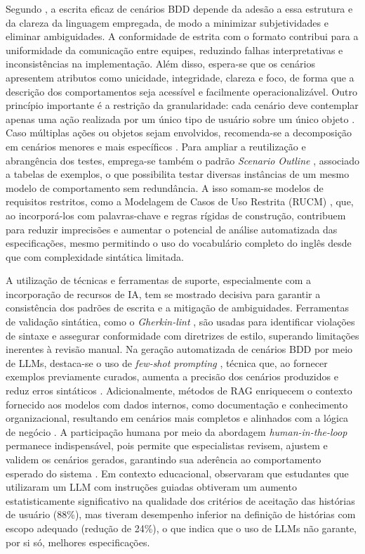 Segundo \cite{Alinezhadtilaki2025}, a escrita eficaz de cenários BDD depende da adesão a essa estrutura e da clareza da linguagem empregada, de modo a minimizar subjetividades e eliminar ambiguidades. A conformidade de estrita com o formato contribui para a uniformidade da comunicação entre equipes, reduzindo falhas interpretativas e inconsistências na implementação. Além disso, espera-se que os cenários apresentem atributos como unicidade, integridade, clareza e foco, de forma que a descrição dos comportamentos seja acessível e facilmente operacionalizável. Outro princípio importante é a restrição da granularidade: cada cenário deve contemplar apenas uma ação realizada por um único tipo de usuário sobre um único objeto \cite{GUPTA2023102141}. Caso múltiplas ações ou objetos sejam envolvidos, recomenda-se a decomposição em cenários menores e mais específicos \cite{GUPTA2023102141}. Para ampliar a reutilização e abrangência dos testes, emprega-se também o padrão \textit{Scenario Outline} \cite{Paduraru2025}, associado a tabelas de exemplos, o que possibilita testar diversas instâncias de um mesmo modelo de comportamento sem redundância. A isso somam-se modelos de requisitos restritos, como a Modelagem de Casos de Uso Restrita (RUCM) \cite{Wang2022}, que, ao incorporá-los com palavras-chave e regras rígidas de construção, contribuem para reduzir imprecisões e aumentar o potencial de análise automatizada das especificações, mesmo permitindo o uso do vocabulário completo do inglês desde que com complexidade sintática limitada.

A utilização de técnicas e ferramentas de suporte, especialmente com a incorporação de recursos de IA, tem se mostrado decisiva para garantir a consistência dos padrões de escrita e a mitigação de ambiguidades. Ferramentas de validação sintática, como o \textit{Gherkin-lint} \cite{Karpurapu2024}, são usadas para identificar violações de sintaxe e assegurar conformidade com diretrizes de estilo, superando limitações inerentes à revisão manual. Na geração automatizada de cenários BDD por meio de LLMs, destaca-se o uso de \textit{few-shot prompting} \cite{Karpurapu2024}, técnica que, ao fornecer exemplos previamente curados, aumenta a precisão dos cenários produzidos e reduz erros sintáticos \cite{Karpurapu2024}. Adicionalmente, métodos de RAG enriquecem o contexto fornecido aos modelos com dados internos, como documentação e conhecimento organizacional, resultando em cenários mais completos e alinhados com a lógica de negócio \cite{Pysmennyi2025}. A participação humana por meio da abordagem \textit{human-in-the-loop} permanece indispensável, pois permite que especialistas revisem, ajustem e validem os cenários gerados, garantindo sua aderência ao comportamento esperado do sistema \cite{Pysmennyi2025}. Em contexto educacional,  observaram que estudantes que utilizaram um LLM com instruções guiadas obtiveram um aumento estatisticamente significativo na qualidade dos critérios de aceitação das histórias de usuário (88\%), mas tiveram desempenho inferior na definição de histórias com escopo adequado (redução de 24\%), o que indica que o uso de LLMs não garante, por si só, melhores especificações.

